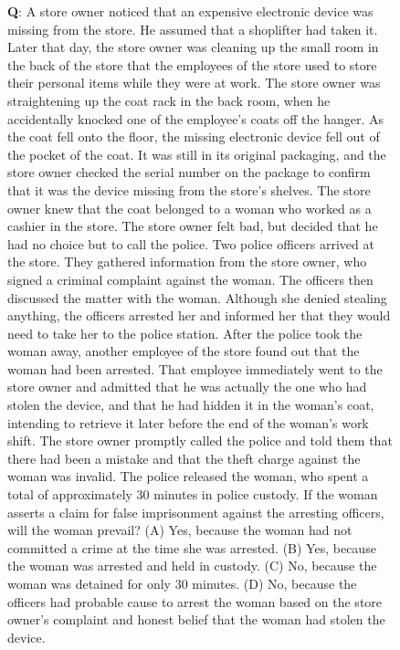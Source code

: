 \begin{figure}[H]
\centering
\begin{tcolorbox}[colback=blue!5!white,colframe=blue!75!black,title=MMLU example (\qweninstruct)]
\textbf{Q}: A store owner noticed that an expensive electronic device was missing from the store. He assumed that a shoplifter had taken it. Later that day, the store owner was cleaning up the small room in the back of the store that the employees of the store used to store their personal items while they were at work. The store owner was straightening up the coat rack in the back room, when he accidentally knocked one of the employee's coats off the hanger. As the coat fell onto the floor, the missing electronic device fell out of the pocket of the coat. It was still in its original packaging, and the store owner checked the serial number on the package to confirm that it was the device missing from the store's shelves. The store owner knew that the coat belonged to a woman who worked as a cashier in the store. The store owner felt bad, but decided that he had no choice but to call the police. Two police officers arrived at the store. They gathered information from the store owner, who signed a criminal complaint against the woman. The officers then discussed the matter with the woman. Although she denied stealing anything, the officers arrested her and informed her that they would need to take her to the police station. After the police took the woman away, another employee of the store found out that the woman had been arrested. That employee immediately went to the store owner and admitted that he was actually the one who had stolen the device, and that he had hidden it in the woman's coat, intending to retrieve it later before the end of the woman's work shift. The store owner promptly called the police and told them that there had been a mistake and that the theft charge against the woman was invalid. The police released the woman, who spent a total of approximately 30 minutes in police custody. If the woman asserts a claim for false imprisonment against the arresting officers, will the woman prevail? (A) Yes, because the woman had not committed a crime at the time she was arrested. (B) Yes, because the woman was arrested and held in custody. (C) No, because the woman was detained for only 30 minutes. (D) No, because the officers had probable cause to arrest the woman based on the store owner's complaint and honest belief that the woman had stolen the device.\\


\end{tcolorbox}
\end{figure}
